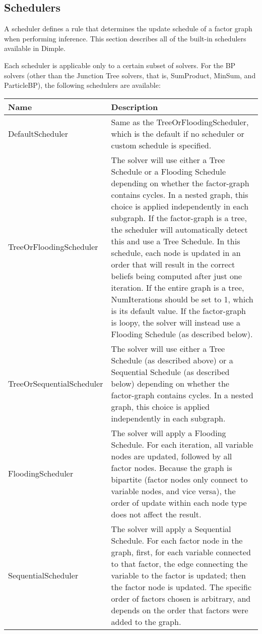 \subsection{Schedulers}
\label{sec:Schedulers}

A scheduler defines a rule that determines the update schedule of a factor graph when performing inference.  This section describes all of the built-in schedulers available in Dimple.

Each scheduler is applicable only to a certain subset of solvers.  For the BP solvers (other than the Junction Tree solvers, that is, SumProduct, MinSum, and ParticleBP), the following schedulers are available:

\begin{longtable}{l p{4in}}
\textbf{Name} & \textbf{Description} \\ \hline \hline
%
\textsf{DefaultScheduler} & Same as the TreeOrFloodingScheduler, which is the default if no scheduler or custom schedule is specified. \\ \hline
%
\textsf{TreeOrFloodingScheduler} & The solver will use either a Tree Schedule or a Flooding Schedule depending on whether the factor-graph contains cycles.  In a nested graph, this choice is applied independently in each subgraph.  If the factor-graph is a tree, the scheduler will automatically detect this and use a Tree Schedule.  In this schedule, each node is updated in an order that will result in the correct beliefs being computed after just one iteration.  If the entire graph is a tree, NumIterations should be set to 1, which is its default value.  If the factor-graph is loopy, the solver will instead use a Flooding Schedule (as described below). \\ \hline
%
\textsf{TreeOrSequentialScheduler} & The solver will use either a Tree Schedule (as described above) or a Sequential Schedule (as described below) depending on whether the factor-graph contains cycles.  In a nested graph, this choice is applied independently in each subgraph.  \\ \hline
%
\textsf{FloodingScheduler} & The solver will apply a Flooding Schedule.  For each iteration, all variable nodes are updated, followed by all factor nodes.  Because the graph is bipartite (factor nodes only connect to variable nodes, and vice versa), the order of update within each node type does not affect the result. \\ \hline
%
\textsf{SequentialScheduler} & The solver will apply a Sequential Schedule.  For each factor node in the graph, first, for each variable connected to that factor, the edge connecting the variable to the factor is updated; then the factor node is updated.  The specific order of factors chosen is arbitrary, and depends on the order that factors were added to the graph. \\ \hline

\end{longtable}
